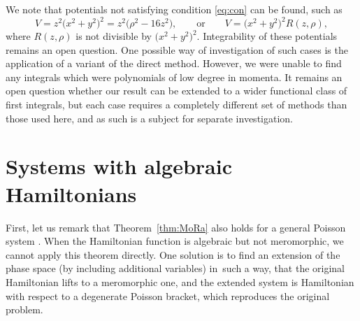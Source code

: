 \documentclass[pdftex]{sigma}
\numberwithin{equation}{section}
\begin{document}
We note that potentials not satisfying condition \eqref{eq:con} can be found, such as
\begin{equation*}
 V = z^2\big(x^2+y^2\big)^2 = z^2\big(\rho^2-16z^2\big), \qquad\text{or}\qquad V=\big(x^2+y^2\big)^2R(z,\rho),
\end{equation*}
where $R(z,\rho)$ is not divisible by $\big(x^2+y^2\big)^2$. Integrability of these potentials remains an open question.
One possible way of investigation of such cases is the application of a variant of the direct method. However, we were unable to find any integrals which were polynomials of low degree in momenta. It remains an open question whether our result can be extended to a wider functional class of first integrals, but each case requires a completely different set of methods than those used here, and as such is a subject for separate investigation.


\appendix

\section{Systems with algebraic Hamiltonians}\label{App0}

First, let us remark that Theorem~\ref{thm:MoRa} also holds for a
general Poisson system \cite{akn}. When the Hamiltonian function is algebraic but not meromorphic,
we cannot apply this theorem directly. One solution is to find an extension of the phase space (by including additional variables) in~such a way, that the original Hamiltonian lifts to a meromorphic one, and the extended system is Hamiltonian
with respect to a degenerate Poisson bracket, which reproduces
the original problem.
\end{document}
